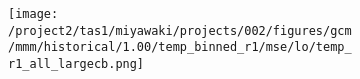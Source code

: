 \documentclass[preview]{standalone}
\begin{document}
\begin{figure}
  \begin{subfigure}[t]{\textwidth}
    \texttt{[image: /project2/tas1/miyawaki/projects/002/figures/gcm/mmm/historical/1.00/temp\_binned\_r1/mse/lo/temp\_r1\_all\_largecb.png]}
  \end{subfigure}

\end{figure}
\end{document}
